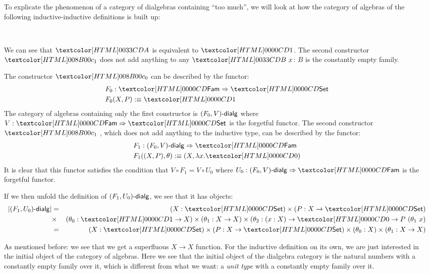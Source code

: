 \begin{remark}
  To explicate the phenomenon of a category of dialgebras containing
  ``too much'', we will look at how the category of algebras of the
  following inductive-inductive definitions is built up:
  \begin{sorts}
    \sortnamety{\Aty}{\Set} \\
    \sortnamety{\Bty}{\Aty \to \Set}
  \end{sorts}
  \begin{datatype}{\Aty}{}
    \constr{\Aco}{\Aty}
  \end{datatype}
  \begin{datatype}{\Bty}{}
  \end{datatype}
  We can see that $\Aty$ is equivalent to $\unitty$. The second
  constructor $\Bci$ does not add anything to any $\Bty\ x$: $B$ is
  the constantly empty family.

  The constructor $\Aco$ can be described by
  the functor:
  \begin{align*}
    &F_0 : \Func{\Fam}{\Set} \\
    &F_0 (X , P) \ddefeq \unitty
  \end{align*}
  The category of algebras containing only the first constructor is
  $\dialgcat{F_0}{V}$ where $V : \Func{\Fam}{\Set}$ is the forgetful
  functor. The second constructor $\Bci$ , which does not add anything
  to the inductive type, can be described by the functor:
  \begin{align*}
    &F_1 : \Func{\dialgcat{F_0}{V}}{\Fam} \\
    &F_1 ((X , P) , \theta) \ddefeq (X , \lambda x . \emptyty)
  \end{align*}
  It is clear that this functor satisfies the condition that
  $V \circ F_1 = V \circ U_0$ where
  $U_0 : \Func{\dialgcat{F_0}{V}}{\Fam}$ is the forgetful functor.

  If we then unfold the definition of $\dialgcat{F_1}{U_0}$, we see
  that it has objects:
  \begin{align*}
    | \dialgcat{F_1}{U_0} | &= &(X : \Set) \times (P : X \to \Set) \\
    &\times &(\theta_0 : \unitty \to X) \times (\theta_1 : X \to X) \times (\theta_2 :  (x : X) \to \emptyty \to P\ (\theta_1\ x) \\
    &= &(X : \Set) \times (P : X \to \Set) \times (\theta_0 : X) \times (\theta_1 : X \to X)
  \end{align*}
  
  As mentioned before: we see that we get a superfluous $X \to X$
  function. For the inductive definition on its own, we are just
  interested in the initial object of the category of algebras. Here
  we see that the initial object of the dialgebra category is the
  natural numbers with a constantly empty family over it, which is
  different from what we want: a \emph{unit type} with a constantly
  empty family over it.
\end{remark}

